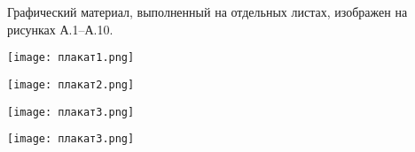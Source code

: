 
Графический материал, выполненный на отдельных листах,
изображен на рисунках А.1--А.10.

\renewcommand{\thefigure}{А.\arabic{figure}} %

\begin{плакат}
    \texttt{[image: плакат1.png]}
    \label{pl1:image}      
\end{плакат}

\begin{плакат}
    \texttt{[image: плакат2.png]}
    \label{pl2:image}      
\end{плакат}

\begin{плакат}
    \texttt{[image: плакат3.png]}
    \label{pl3:image}      
\end{плакат}

\begin{плакат}
    \texttt{[image: плакат3.png]}
    \label{pl4:image}      
\end{плакат}



